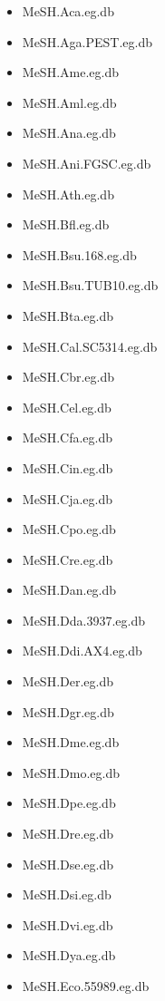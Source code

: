 \documentclass[margin,line,10pt]{res}
\newenvironment{list1}{
  \begin{list}{\ding{113}}{%
      \setlength{\itemsep}{0in}
      \setlength{\parsep}{0in} \setlength{\parskip}{0in}
      \setlength{\topsep}{0in} \setlength{\partopsep}{0in} 
      \setlength{\leftmargin}{0.17in}}}{\end{list}}
\begin{document}
\begin{resume}
\begin{list1}
\begin{multicols}{2}
\begin{itemize}
\item MeSH.Aca.eg.db
\item MeSH.Aga.PEST.eg.db
\item MeSH.Ame.eg.db
\item MeSH.Aml.eg.db
\item MeSH.Ana.eg.db
\item MeSH.Ani.FGSC.eg.db
\item MeSH.Ath.eg.db
\item MeSH.Bfl.eg.db
\item MeSH.Bsu.168.eg.db
\item MeSH.Bsu.TUB10.eg.db
\item MeSH.Bta.eg.db 
\item MeSH.Cal.SC5314.eg.db
\item MeSH.Cbr.eg.db 
\item MeSH.Cel.eg.db
\item MeSH.Cfa.eg.db
\item MeSH.Cin.eg.db
\item MeSH.Cja.eg.db
\item MeSH.Cpo.eg.db
\item MeSH.Cre.eg.db  
\item MeSH.Dan.eg.db
\item MeSH.Dda.3937.eg.db
\item MeSH.Ddi.AX4.eg.db
\item MeSH.Der.eg.db 
\item MeSH.Dgr.eg.db 
\item MeSH.Dme.eg.db 
\item MeSH.Dmo.eg.db 
\item MeSH.Dpe.eg.db
\item MeSH.Dre.eg.db
\item MeSH.Dse.eg.db
\item MeSH.Dsi.eg.db
\item MeSH.Dvi.eg.db  
\item MeSH.Dya.eg.db
\item MeSH.Eco.55989.eg.db

\end{itemize}
\end{multicols}
\end{list1}
\end{resume}
\end{document}
